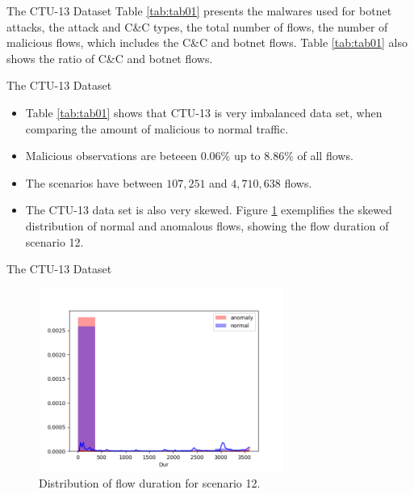 \documentclass[newPxFont, numfooter, sectionpages]{beamer}
\begin{document}
\begin{frame}[c]{The CTU-13 Dataset}
	Table \ref{tab:tab01} presents the malwares used for botnet attacks, the attack and C\&C types, the total number of flows, the number of malicious flows, which includes the C\&C and botnet flows. Table \ref{tab:tab01} also shows the ratio of C\&C and botnet flows.
\end{frame}

\begin{frame}[c]{The CTU-13 Dataset}
	\begin{itemize}
		\item Table \ref{tab:tab01} shows that CTU-13 is very imbalanced data set, when comparing the amount of malicious to normal traffic.
		\item Malicious observations are beteeen $0.06\%$ up to $8.86\%$ of all flows.
		\item The scenarios have between $107,251$ and $4,710,638$ flows.
		\item The CTU-13 data set is also very skewed. Figure \ref{fig:fig06} exemplifies the skewed distribution of normal and anomalous flows, showing the flow duration of scenario 12.
	\end{itemize}
\end{frame}

\begin{frame}[c]{The CTU-13 Dataset}
	\begin{figure}[h!]
	     \centering
	     \includegraphics[width=8cm]{figures/raw_distplot_capture20110812_Dur.png}
	     \caption{Distribution of flow duration for scenario 12.}
	     \label{fig:fig06}
	\end{figure}
\end{frame}
\end{document}
